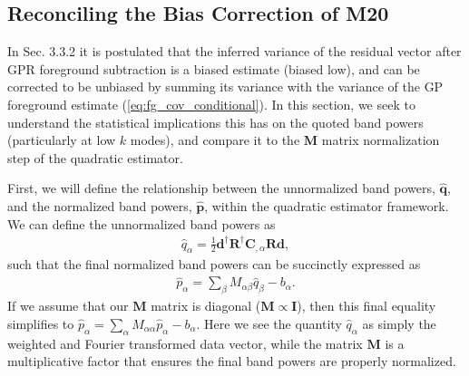 \documentclass[a4paper,fleqn,usenatbib]{mnras}
\def\d{\boldsymbol{d}}
\def\R{\boldsymbol{R}}
\def\q{\boldsymbol{q}}
\def\p{\boldsymbol{p}}
\def\M{\boldsymbol{M}}
\def\C{\boldsymbol{C}}
\def\I{\boldsymbol{I}}
\begin{document}
\subsection{Reconciling the Bias Correction of M20}
\label{sec:bias_correction}

In  Sec. 3.3.2 it is postulated that the inferred variance of the residual vector after GPR foreground subtraction is a biased estimate (biased low), and can be corrected to be unbiased by summing its variance with the variance of the GP foreground estimate (\autoref{eq:fg_cov_conditional}).
In this section, we seek to understand the statistical implications this has on the quoted band powers (particularly at low $k$ modes), and compare it to the $\M$ matrix normalization step of the quadratic estimator.

First, we will define the relationship between the unnormalized band powers, $\hat{\q}$, and the normalized band powers, $\hat{\p}$, within the quadratic estimator framework.
We can define the unnormalized band powers as
\begin{align}
\label{eq:unnorm_q}
\hat{q}_\alpha = \frac{1}{2}\d^\dagger\R^\dagger\C_{,\alpha}\R\d,
\end{align}
such that the final normalized band powers can be succinctly expressed as
\begin{align}
\hat{p}_\alpha = \sum_\beta M_{\alpha\beta}\hat{q}_\beta - b_\alpha.
\end{align}
If we assume that our $\M$ matrix is diagonal ($\M\propto\I$), then this final equality simplifies to $\hat{p}_{\alpha} = \sum_\alpha M_{\alpha\alpha}\hat{p}_\alpha - b_\alpha$.
Here we see the quantity $\hat{q}_\alpha$ as simply the weighted and Fourier transformed data vector, while the matrix $\M$ is a multiplicative factor that ensures the final band powers are properly normalized.
\end{document}
